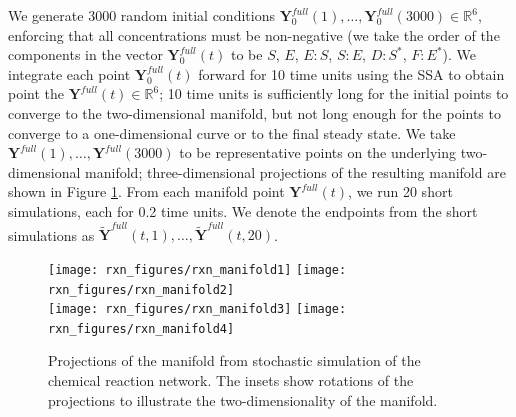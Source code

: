 \documentclass[aip,jcp,reprint,twocolumn]{revtex4-1}
\begin{document}
We generate 3000 random initial conditions $\mathbf{Y}^{full}_0(1), \dots, \mathbf{Y}^{full}_0(3000) \in \mathbb{R}^6$, enforcing that all concentrations must be non-negative
(we take the order of the components in the vector $\mathbf{Y}^{full}_0(t)$ to be $S$, $E$, $E:S$, $S:E$, $D:S^{*}$, $F:E^{*}$).
%
We integrate each point $\mathbf{Y}^{full}_0(t)$ forward for 10 time units using the SSA to obtain point the $\mathbf{Y}^{full}(t) \in \mathbb{R}^6$;
10 time units is sufficiently long for the initial points to converge to the two-dimensional manifold,
but not long enough for the points to converge to a one-dimensional curve or to the final steady state.
%
We take $\mathbf{Y}^{full}(1), \dots, \mathbf{Y}^{full}(3000)$ to be representative points on the underlying two-dimensional manifold;
three-dimensional projections of the resulting manifold are shown in Figure \ref{fig:rxn_manifolds}.
%
From each manifold point $\mathbf{Y}^{full}(t)$, we run 20 short simulations, each for 0.2 time units.
%
We denote the endpoints from the short simulations as $\widetilde{\mathbf{Y}}^{full}(t, 1), \dots, \widetilde{\mathbf{Y}}^{full}(t, 20)$.

\begin{figure}[ht]
  \texttt{[image: rxn\_figures/rxn\_manifold1]}
  \texttt{[image: rxn\_figures/rxn\_manifold2]} \\
  \texttt{[image: rxn\_figures/rxn\_manifold3]}
  \texttt{[image: rxn\_figures/rxn\_manifold4]} \\
    \caption{Projections of the manifold from stochastic simulation of the chemical reaction network. The insets show rotations of the projections to illustrate the two-dimensionality of the manifold.}
    \label{fig:rxn_manifolds}
\end{figure}
\end{document}
